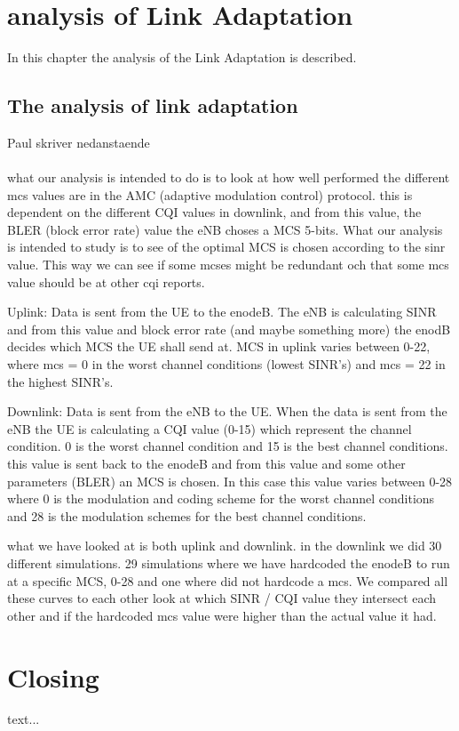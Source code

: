 \documentclass[cropmarks, frame, english]{idamasterthesis}
\begin{document}
\chapter{analysis of Link Adaptation}
In this chapter the analysis of the Link Adaptation is described. 

\section{The analysis of link adaptation}
Paul skriver nedanstaende \\ \\
what our analysis is intended to do is to look at how well performed the different mcs values are in the AMC (adaptive modulation control) protocol. this is dependent on the different CQI values in downlink, and from this value, the BLER (block error rate) value the eNB choses a MCS 5-bits. What our analysis is intended to study is to see of the optimal MCS is chosen according to the sinr value. This way we can see if some mcses might be redundant och that some mcs value should be at other cqi reports. 

Uplink: \newline
Data is sent from the UE to the enodeB. The eNB is calculating SINR and from this value and block error rate (and maybe something more) the enodB decides which MCS the UE shall send at. MCS in uplink varies between 0-22, where mcs = 0 in the worst channel conditions (lowest SINR's) and mcs = 22 in the highest SINR's. 

Downlink: \newline
Data is sent from the eNB to the UE. When the data is sent from the eNB the UE is calculating a CQI value (0-15) which represent the channel condition. 0 is the worst channel condition and 15 is the best channel conditions. this value is sent back to the enodeB and from this value and some other parameters (BLER) an MCS is chosen. In this case this value varies between 0-28 where 0 is the modulation and coding scheme for the worst channel conditions and 28 is the modulation schemes for the best channel conditions.

what we have looked at is both uplink and downlink. in the downlink we did 30 different simulations. 29 simulations where we have hardcoded the enodeB to run at a specific MCS, 0-28 and one where did not hardcode a mcs. We compared all these curves to each other look at which SINR / CQI value they intersect each other and if the hardcoded mcs value were higher than the actual value it had.

\chapter{Closing}

text...
\end{document}
